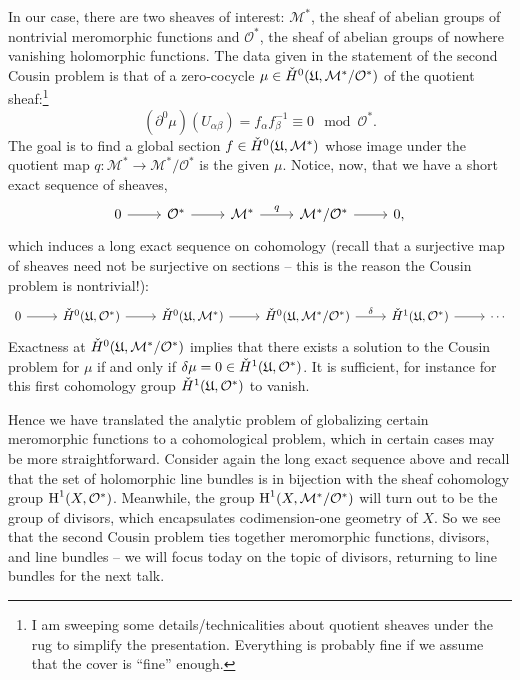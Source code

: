 \documentclass{amsart}
\begin{document}
In our case, there are two sheaves of interest: $\mathcal{M}^*$, the sheaf of abelian groups of nontrivial meromorphic functions
and $\mathcal{O}^*$, the sheaf of abelian groups of nowhere vanishing holomorphic functions. The data given in the
statement of the second Cousin problem is that of a zero-cocycle $\mu\in\check H^0(\mathfrak U, \mathcal{M}^*/\mathcal{O}^*)$
of the quotient sheaf:\footnote{I am sweeping some details/technicalities about quotient sheaves under the rug to simplify
the presentation. Everything is probably fine if we assume that the cover is ``fine'' enough.}
\begin{equation*}
    (\partial^0 \mu)(U_{\alpha\beta}) = f_\alpha f_\beta^{-1} \equiv 0\mod \mathcal{O}^*.
\end{equation*}
The goal is to find a global section $f\in\check H^0(\mathfrak U, \mathcal{M}^*)$ whose image under the quotient map
$q: \mathcal{M}^* \to \mathcal{M}^*/\mathcal{O}^*$ is the given $\mu$. Notice, now, that we have a short
exact sequence of sheaves,
\begin{equation*}
    \begin{tikzcd}
        0\rar & \mathcal{O}^* \rar & \mathcal{M}^*\rar{q} & \mathcal{M}^*/\mathcal{O}^*\rar & 0,
    \end{tikzcd}
\end{equation*}
which induces a long exact sequence on cohomology (recall that a surjective map of sheaves need not be
surjective on sections -- this is the reason the Cousin problem is nontrivial!):
\begin{equation*}
    \begin{tikzcd}
        0\rar & \check H^0(\fr U, \mathcal{O}^*) \rar & \check H^0(\fr U, \mathcal{M}^*)\rar & \check H^0(\fr U, \mathcal{M}^*/\mathcal{O}^*)\rar{\delta} & \check H^1(\fr U,\mathcal{O}^*)\rar & \cdots
    \end{tikzcd}
\end{equation*}
Exactness at $\check H^0(\mathfrak U,\mathcal{M}^*/\mathcal{O}^*)$ implies that there exists a solution to the Cousin
problem for $\mu$ if and only if $\delta \mu=0\in \check H^1(\mathfrak U, \mathcal{O}^*)$. It is sufficient, for
instance for this first cohomology group $\check H^1(\mathfrak U, \mathcal{O}^*)$ to vanish.

Hence we have translated the analytic problem of globalizing certain meromorphic functions to a cohomological problem,
which in certain cases may be more straightforward. Consider again the long exact sequence above and recall that
the set of holomorphic line bundles is in bijection with the sheaf cohomology group $\operatorname{H}^1(X,\mathcal{O}^*)$.
Meanwhile, the group $\operatorname{H}^1(X, \mathcal{M}^*/\mathcal{O}^*)$ will turn out to be the group of divisors,
which encapsulates codimension-one geometry of $X$.
So we see that the second Cousin problem ties together meromorphic functions, divisors, and line bundles --
we will focus today on the topic of divisors, returning to line bundles for the next talk.
\end{document}
